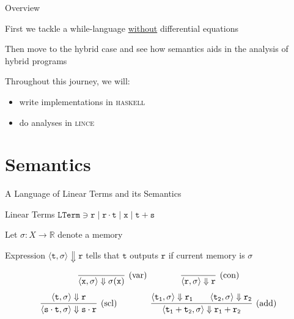 \documentclass{beamer}
\begin{document}
\begin{frame}{Overview}

        First we tackle a \alert{while-language} \underline{without}
        differential equations

        Then move to the hybrid case and see how semantics aids in the analysis
        of hybrid programs

        Throughout this journey, we will:
        \begin{itemize}
                \item write implementations in \textsc{haskell}
                \item do analyses in \textsc{lince}
        \end{itemize}
\end{frame}

\section{Semantics}

\begin{frame}{A Language of Linear Terms and its Semantics}

        \begin{block}{Linear Terms}
	$\mathtt{LTerm} \ni \mathtt{r} \mid \mathtt{r \cdot t}
        \mid \mathtt{x}  \mid \mathtt{t + s }$
	\end{block}

        Let $\sigma : X \to \mathbb{R}$ denote a \alert{memory}

        Expression $\langle \mathtt{t},\sigma \rangle \Downarrow \mathtt{r}$
        tells that $\mathtt{t}$ outputs $\mathtt{r}$ if current memory is
        $\sigma$

        \[
                \infer[(\text{var})]{\langle \mathtt{x}, \sigma \rangle 
                \Downarrow \sigma(\mathtt{x})}{} \qquad \qquad
                \infer[(\text{con})]{\langle \mathtt{r}, \sigma \rangle 
                \Downarrow \mathtt{r}}{}
        \] \vspace{0.1cm}        
        \[        
                \infer[(\text{scl})]{  
                        \langle \mathtt{s} \cdot \mathtt{t}, \sigma \rangle \Downarrow 
                        \mathtt{s \cdot r}
                        }{
                        \langle \mathtt{t}, \sigma \rangle \Downarrow \mathtt{r}
                } \qquad \qquad
                \infer[(\text{add})]{  
                        \langle \mathtt{t_1} + \mathtt{t_2}, \sigma \rangle \Downarrow 
                        \mathtt{r_1 + r_2}
                        }{
                        \langle \mathtt{t_1}, \sigma \rangle \Downarrow \mathtt{r_1} \qquad
                        \langle \mathtt{t_2}, \sigma \rangle \Downarrow \mathtt{r_2}
                }
        \]
\end{frame}        
\end{document}
